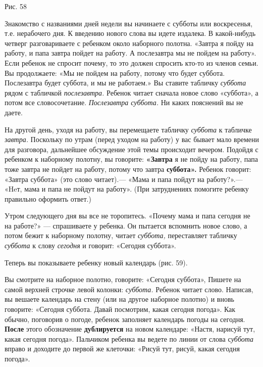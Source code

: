 \documentclass[a5paper]{book}
\renewcommand{\emph}[1]{\textit{#1}}
\begin{document}
Рис. 58

Знакомство с названиями дней недели вы начинаете с субботы или
воскресенья, т.е. нерабочего дня. К введению нового слова вы идете
издалека. В какой-нибудь четверг разговариваете с ребенком около
наборного полотна. «Завтра я пойду на работу, и папа завтра пойдет на
работу. А послезавтра мы не пойдем на работу». Если ребенок не спросит
почему, то это должен спросить кто-то из членов семьи. Вы продолжаете:
«Мы не пойдем на работу, потому что будет суббота. Послезавтра будет
суббота, и мы не работаем.» Вы ставите табличку \emph{суббота} рядом с
табличкой \emph{послезавтра.} Ребенок читает сначала новое слово
«суббота», а потом все словосочетание. \emph{Послезавтра суббота.} Ни
каких пояснений вы не даете.

На другой день, уходя на работу, вы перемещаете табличку \emph{суббота}
к табличке \emph{завтра.} Поскольку по утрам (перед уходом на работу) у
вас бывает мало времени для разговора, дальнейшее обсуждение этой темы
происходит вечером. Подойдя с ребенком к наборному полотну, вы говорите:
\textbf{«Завтра} я не пойду на работу, папа тоже завтра не пойдет на
работу, потому что завтра \textbf{суббота».} Ребенок говорит: «Завтра
суббота» (это слово читает).--- «Мама и папа пойдут на работу?».---
«Heт, мама и папа не пойдут на работу». (При затруднениях помогите
ребенку правильно оформить ответ.)

Утром следующего дня вы все не торопитесь. «Почему мама и папа сегодня
не на работе?» --- спрашиваете у ребенка. Он пытается вспомнить новое
слово, а потом бежит к наборному полотну, читает \emph{суббота,}
переставляет табличку \emph{суббота} к слову \emph{сегодня} и говорит:
«Сегодня суббота».

Теперь вы показываете ребенку новый календарь (рис. 59).

Вы смотрите на наборное полотно, говорите: «Сегодня суббота», Пишете на
самой верхней строчке левой колонки: \emph{суббота.} Ребенок читает
слово. Написав, вы вешаете календарь на стену (или на другое наборное
полотно) и вновь говорите: «Сегодня суббота. Давай посмотрим, какая
сегодня погода». Как обычно, поговорив о погоде, ребенок заполняет
календарь погоды на сегодня. \textbf{После} этого обозначение
\textbf{дублируется} на новом календаре: «Настя, нарисуй тут, какая
сегодня погода». Пальчиком ребенка вы ведете по линии от слова
с\emph{уббота} вправо и доходите до первой же клеточки: «Рисуй тут,
рисуй, какая сегодня погода».
\end{document}
